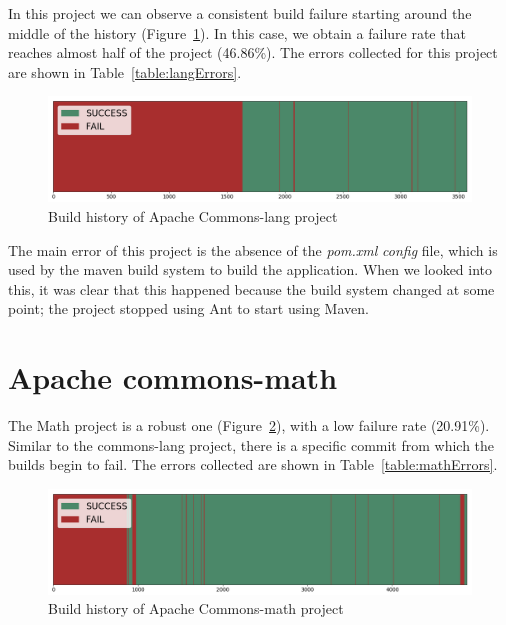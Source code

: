
In this project we can observe a consistent build failure starting around the middle of the history (Figure~\ref{fig:langHist}).
In this case, we obtain a failure rate that reaches almost half of the project (46.86\%).
The errors collected for this project are shown in Table~\ref{table:langErrors}.

\begin{figure}[h]
	\begin{center}
		\includegraphics[width=\linewidth]{img/charts/LangHist}
		\caption{Build history of Apache Commons-lang project}
		\label{fig:langHist}
	\end{center}
\end{figure}

The main error of this project is the absence of the \textit{pom.xml} \emph{config} file, which is used by the maven build system to build the application.
When we looked into this, it was clear that this happened because the build system changed at some point; the project stopped using Ant to start using Maven.

\section{Apache commons-math}

The Math project is a robust one (Figure~\ref{fig:mathHist}), with a low failure rate (20.91\%).
Similar to the commons-lang project, there is a specific commit from which the builds begin to fail.
The errors collected are shown in Table~\ref{table:mathErrors}.

\begin{figure}[h]
	\begin{center}
		\includegraphics[width=\linewidth]{img/charts/MathHist}
		\caption{Build history of Apache Commons-math project}
		\label{fig:mathHist}
	\end{center}
\end{figure}


